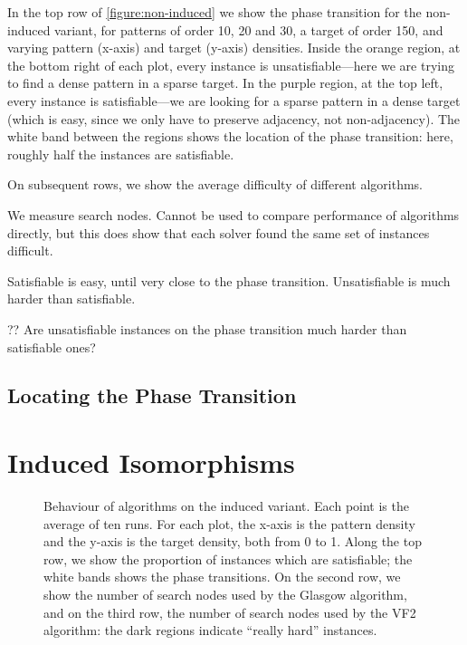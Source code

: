 \documentclass[letterpaper]{article}
\begin{document}
In the top row of \cref{figure:non-induced} we show the phase transition for the non-induced
variant, for patterns of order 10, 20 and 30, a target of order 150, and varying pattern (x-axis)
and target (y-axis) densities. Inside the orange region, at the bottom right of each plot, every
instance is unsatisfiable---here we are trying to find a dense pattern in a sparse target. In the
purple region, at the top left, every instance is satisfiable---we are looking for a sparse pattern
in a dense target (which is easy, since we only have to preserve adjacency, not non-adjacency). The
white band between the regions shows the location of the phase transition: here, roughly half the
instances are satisfiable.

On subsequent rows, we show the average difficulty of different algorithms.

We measure search nodes. Cannot be used to compare performance of algorithms directly, but this does
show that each solver found the same set of instances difficult.

Satisfiable is easy, until very close to the phase transition. Unsatisfiable is much harder than
satisfiable.

?? Are unsatisfiable instances on the phase transition much harder than satisfiable ones?

\subsection{Locating the Phase Transition}

\section{Induced Isomorphisms}

\begin{figure*}
    
    \setlength{\abovecaptionskip}{-2em}
    \caption{Behaviour of algorithms on the induced variant. Each point is the average of ten
        runs. For each plot, the x-axis is the pattern density and the y-axis is the target
        density, both from 0 to 1. Along the top row, we show the proportion of instances which are
        satisfiable; the white bands shows the phase transitions. On the second row, we show the
        number of search nodes used by the Glasgow algorithm, and on the third row, the number of
        search nodes used by the VF2 algorithm: the dark regions indicate ``really hard''
        instances.}\label{figure:induced}
\end{figure*}
\end{document}
